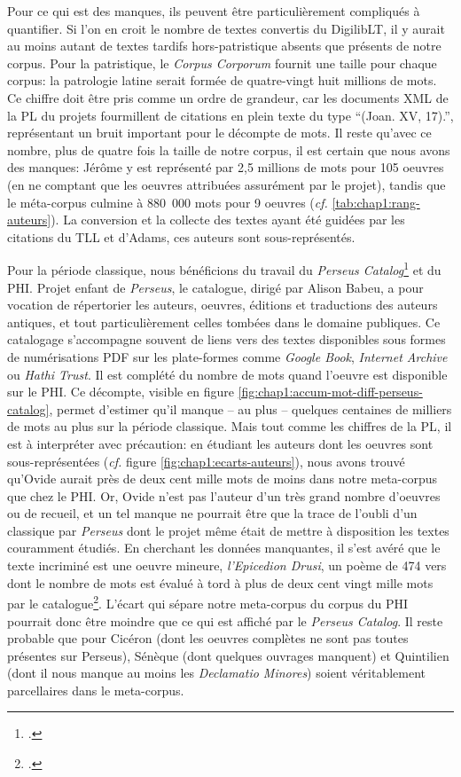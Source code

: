 Pour ce qui est des manques, ils peuvent être particulièrement compliqués à quantifier. Si l'on en croit le nombre de textes convertis du DigilibLT, il y aurait au moins autant de textes tardifs hors-patristique absents que présents de notre corpus. Pour la patristique, le \textit{Corpus Corporum} fournit une taille pour chaque corpus: la patrologie latine serait formée de quatre-vingt huit millions de mots. Ce chiffre doit être pris comme un ordre de grandeur, car les documents XML de la PL du projets fourmillent de citations en plein texte du type \enquote{(Joan. XV, 17).}, représentant un bruit important pour le décompte de mots. Il reste qu'avec ce nombre, plus de quatre fois la taille de notre corpus, il est certain que nous avons des manques: Jérôme y est représenté par 2,5 millions de mots pour 105 oeuvres (en ne comptant que les oeuvres attribuées assurément par le projet), tandis que le méta-corpus culmine à 880~000 mots pour 9 oeuvres (\textit{cf.} \ref{tab:chap1:rang-auteurs}). La conversion et la collecte des textes ayant été guidées par les citations du TLL et d'Adams, ces auteurs sont sous-représentés.


Pour la période classique, nous bénéficions du travail du \textit{Perseus Catalog}\footcite{babeu2019perseus} et du PHI. Projet enfant de \textit{Perseus}, le catalogue, dirigé par Alison Babeu, a pour vocation de répertorier les auteurs, oeuvres, éditions et traductions des auteurs antiques, et tout particulièrement celles tombées dans le domaine publiques. Ce catalogage s'accompagne souvent de liens vers des textes disponibles sous formes de numérisations PDF sur les plate-formes comme \textit{Google Book}, \textit{Internet Archive} ou \textit{Hathi Trust}. Il est complété du nombre de mots quand l'oeuvre est disponible sur le PHI. Ce décompte, visible en figure \ref{fig:chap1:accum-mot-diff-perseus-catalog}, permet d'estimer qu'il manque -- au plus -- quelques centaines de milliers de mots au plus sur la période classique. Mais tout comme les chiffres de la PL, il est à interpréter avec précaution: en étudiant les auteurs dont les oeuvres sont sous-représentées (\textit{cf.} figure \ref{fig:chap1:ecarts-auteurs}), nous avons trouvé qu'Ovide aurait près de deux cent mille mots de moins dans notre meta-corpus que chez le PHI. Or, Ovide n'est pas l'auteur d'un très grand nombre d'oeuvres ou de recueil, et un tel manque ne pourrait être que la trace de l'oubli d'un classique par \textit{Perseus} dont le projet même était de mettre à disposition les textes couramment étudiés. En cherchant les données manquantes, il s'est avéré que le texte incriminé est une oeuvre mineure, \textit{l'Epicedion Drusi}, un poème de 474 vers dont le nombre de mots est évalué à tord à plus de deux cent vingt mille mots par le catalogue\footcite{clerice_catalog_dataphi0959phi015_2021}. L'écart qui sépare notre meta-corpus du corpus du PHI pourrait donc être moindre que ce qui est affiché par le \textit{Perseus Catalog}. Il reste probable que pour Cicéron (dont les oeuvres complètes ne sont pas toutes présentes sur Perseus), Sénèque (dont quelques ouvrages manquent) et Quintilien (dont il nous manque au moins les \textit{Declamatio Minores}) soient véritablement parcellaires dans le meta-corpus.

